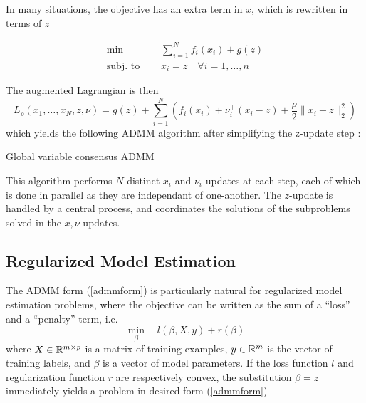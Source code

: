 \documentclass[11pt]{article}
\begin{document}
In many situations, the objective has an extra term in $x$, which is rewritten in 
terms of $z$ 

\begin{equation} \label{gen_seperable}
\begin{aligned}
        \min \quad & \sum_{i=1}^N f_i(x_i) + g(z)\\
        \textrm{subj. to } \quad & x_i = z \quad \forall i = 1, \ldots, n
\end{aligned}
\end{equation}

The augmented Lagrangian is then 
\[ 
    L_\rho(x_1, \ldots, x_N, z, \nu) = 
    g(z) + \sum_{i=1}^N \left( f_i(x_i) + \nu_i^\top(x_i - z) + \frac{\rho}{2} \|x_i - z\|_2^2 \right)
\]
which yields the following ADMM algorithm after simplifying the z-update step \cite{boydistributed}:

\begin{algorithm}[H]
    \caption{Global variable consensus ADMM}

    \SetAlgoNoLine

\end{algorithm}
\vspace{5pt}
This algorithm performs $N$ distinct $x_i$ and $\nu_i$-updates at each step, each of which is 
done in parallel as they are independant of one-another. The $z$-update is handled by a central 
process, and coordinates the solutions of the subproblems solved in the $x, \nu$ updates.

\subsection{Regularized Model Estimation}

The ADMM form (\ref{admmform}) is particularly natural for regularized model estimation problems, 
where the objective can be written as the sum of a ``loss'' and a ``penalty'' term, i.e.
\[
    \min_{\beta} \quad {l(\beta, X, y) + r(\beta)}
\]
where $X \in \mathbb{R}^{m \times p}$ is a matrix of training examples, $y \in \mathbb{R}^m$ is the vector of training
labels, and $\beta$ is a vector of model parameters. If the loss function $l$ and regularization function 
$r$ are respectively convex, the substitution $\beta = z$ immediately yields a problem in desired form (\ref{admmform})
\end{document}
